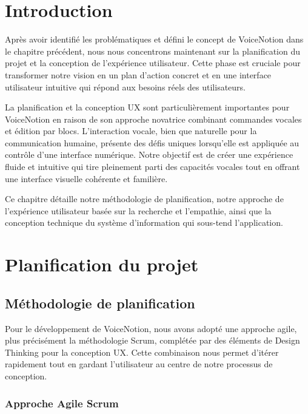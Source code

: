 


\section{Introduction}

Après avoir identifié les problématiques et défini le concept de VoiceNotion dans le chapitre précédent, nous nous concentrons maintenant sur la planification du projet et la conception de l'expérience utilisateur. Cette phase est cruciale pour transformer notre vision en un plan d'action concret et en une interface utilisateur intuitive qui répond aux besoins réels des utilisateurs.

La planification et la conception UX sont particulièrement importantes pour VoiceNotion en raison de son approche novatrice combinant commandes vocales et édition par blocs. L'interaction vocale, bien que naturelle pour la communication humaine, présente des défis uniques lorsqu'elle est appliquée au contrôle d'une interface numérique. Notre objectif est de créer une expérience fluide et intuitive qui tire pleinement parti des capacités vocales tout en offrant une interface visuelle cohérente et familière.

Ce chapitre détaille notre méthodologie de planification, notre approche de l'expérience utilisateur basée sur la recherche et l'empathie, ainsi que la conception technique du système d'information qui sous-tend l'application.

\section{Planification du projet}

\subsection{Méthodologie de planification}

Pour le développement de VoiceNotion, nous avons adopté une approche agile, plus précisément la méthodologie Scrum, complétée par des éléments de Design Thinking pour la conception UX. Cette combinaison nous permet d'itérer rapidement tout en gardant l'utilisateur au centre de notre processus de conception.

\subsubsection{Approche Agile Scrum}

